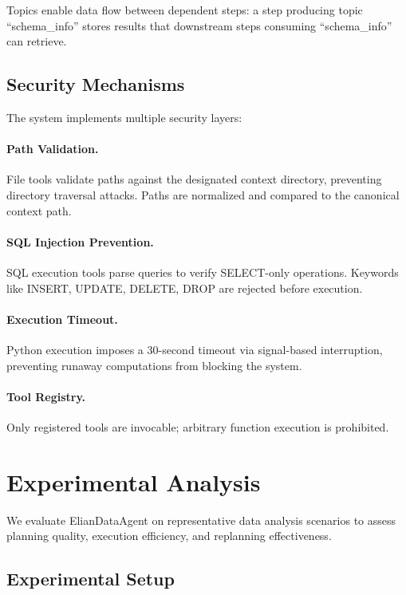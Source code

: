\documentclass{article}
\theoremstyle{definition}
\begin{document}
Topics enable data flow between dependent steps: a step producing topic ``schema\_info'' stores results that downstream steps consuming ``schema\_info'' can retrieve.

\subsection{Security Mechanisms}

The system implements multiple security layers:

\paragraph{Path Validation.}
File tools validate paths against the designated context directory, preventing directory traversal attacks. Paths are normalized and compared to the canonical context path.

\paragraph{SQL Injection Prevention.}
SQL execution tools parse queries to verify SELECT-only operations. Keywords like INSERT, UPDATE, DELETE, DROP are rejected before execution.

\paragraph{Execution Timeout.}
Python execution imposes a 30-second timeout via signal-based interruption, preventing runaway computations from blocking the system.

\paragraph{Tool Registry.}
Only registered tools are invocable; arbitrary function execution is prohibited.


\section{Experimental Analysis}

We evaluate ElianDataAgent on representative data analysis scenarios to assess planning quality, execution efficiency, and replanning effectiveness.

\subsection{Experimental Setup}
\end{document}
